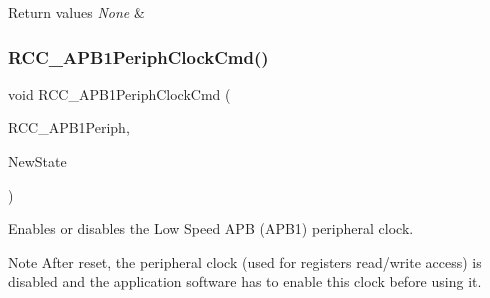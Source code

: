 \begin{DoxyRetVals}{Return values}
{\em None} & \\
\hline
\end{DoxyRetVals}
\mbox{\label{group___r_c_c_gaee7cc5d73af7fe1986fceff8afd3973e}} 
\subsubsection{\texorpdfstring{R\+C\+C\+\_\+\+A\+P\+B1\+Periph\+Clock\+Cmd()}{RCC\_APB1PeriphClockCmd()}}
{\footnotesize\ttfamily void R\+C\+C\+\_\+\+A\+P\+B1\+Periph\+Clock\+Cmd (\begin{DoxyParamCaption}\item[{uint32\+\_\+t}]{R\+C\+C\+\_\+\+A\+P\+B1\+Periph,  }\item[{Functional\+State}]{New\+State }\end{DoxyParamCaption})}



Enables or disables the Low Speed A\+PB (A\+P\+B1) peripheral clock. 

\begin{DoxyNote}{Note}
After reset, the peripheral clock (used for registers read/write access) is disabled and the application software has to enable this clock before using it. 
\end{DoxyNote}

